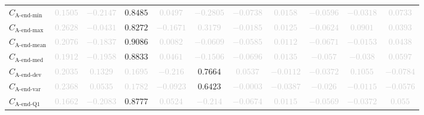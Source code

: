 \documentclass{standalone}
\newcommand{\lastminname}{\text{A-end-min}}
\newcommand{\lastmin}{C_{\lastminname}}
\newcommand{\lastmaxname}{\text{A-end-max}}
\newcommand{\lastmax}{C_{\lastmaxname}}
\newcommand{\lastmeanname}{\text{A-end-mean}}
\newcommand{\lastmean}{C_{\lastmeanname}}
\newcommand{\lastmedianname}{\text{A-end-med}}
\newcommand{\lastmedian}{C_{\lastmedianname}}
\newcommand{\lastdevname}{\text{A-end-dev}}
\newcommand{\lastdev}{C_{\lastdevname}}
\newcommand{\lastvarname}{\text{A-end-var}}
\newcommand{\lastvar}{C_{\lastvarname}}
\newcommand{\lastqonename}{\text{A-end-Q1}}
\newcommand{\lastqone}{C_{\lastqonename}}
\begin{document}
\begin{tabular}{lcccccccccc}
$\lastmin$ & \textcolor{lightgray}{$0.1505$} & \textcolor{lightgray}{$-0.2147$} & $0.8485$ & \textcolor{lightgray}{$0.0497$} & \textcolor{lightgray}{$-0.2805$} & \textcolor{lightgray}{$-0.0738$} & \textcolor{lightgray}{$0.0158$} & \textcolor{lightgray}{$-0.0596$} & \textcolor{lightgray}{$-0.0318$} & \textcolor{lightgray}{$0.0733$} \\ 
$\lastmax$ & \textcolor{lightgray}{$0.2628$} & \textcolor{lightgray}{$-0.0431$} & $0.8272$ & \textcolor{lightgray}{$-0.1671$} & \textcolor{lightgray}{$0.3179$} & \textcolor{lightgray}{$-0.0185$} & \textcolor{lightgray}{$0.0125$} & \textcolor{lightgray}{$-0.0624$} & \textcolor{lightgray}{$0.0901$} & \textcolor{lightgray}{$0.0393$} \\ 
$\lastmean$ & \textcolor{lightgray}{$0.2076$} & \textcolor{lightgray}{$-0.1837$} & $0.9086$ & \textcolor{lightgray}{$0.0082$} & \textcolor{lightgray}{$-0.0609$} & \textcolor{lightgray}{$-0.0585$} & \textcolor{lightgray}{$0.0112$} & \textcolor{lightgray}{$-0.0671$} & \textcolor{lightgray}{$-0.0153$} & \textcolor{lightgray}{$0.0438$} \\ 
$\lastmedian$ & \textcolor{lightgray}{$0.1912$} & \textcolor{lightgray}{$-0.1958$} & $0.8833$ & \textcolor{lightgray}{$0.0461$} & \textcolor{lightgray}{$-0.1506$} & \textcolor{lightgray}{$-0.0696$} & \textcolor{lightgray}{$0.0135$} & \textcolor{lightgray}{$-0.057$} & \textcolor{lightgray}{$-0.038$} & \textcolor{lightgray}{$0.0597$} \\ 
$\lastdev$ & \textcolor{lightgray}{$0.2035$} & \textcolor{lightgray}{$0.1329$} & \textcolor{lightgray}{$0.1695$} & \textcolor{lightgray}{$-0.216$} & $0.7664$ & \textcolor{lightgray}{$0.0537$} & \textcolor{lightgray}{$-0.0112$} & \textcolor{lightgray}{$-0.0372$} & \textcolor{lightgray}{$0.1055$} & \textcolor{lightgray}{$-0.0784$} \\ 
$\lastvar$ & \textcolor{lightgray}{$0.2368$} & \textcolor{lightgray}{$0.0535$} & \textcolor{lightgray}{$0.1782$} & \textcolor{lightgray}{$-0.0923$} & $0.6423$ & \textcolor{lightgray}{$-0.0003$} & \textcolor{lightgray}{$-0.0387$} & \textcolor{lightgray}{$-0.026$} & \textcolor{lightgray}{$-0.0115$} & \textcolor{lightgray}{$-0.0576$} \\ 
$\lastqone$ & \textcolor{lightgray}{$0.1662$} & \textcolor{lightgray}{$-0.2083$} & $0.8777$ & \textcolor{lightgray}{$0.0524$} & \textcolor{lightgray}{$-0.214$} & \textcolor{lightgray}{$-0.0674$} & \textcolor{lightgray}{$0.0115$} & \textcolor{lightgray}{$-0.0569$} & \textcolor{lightgray}{$-0.0372$} & \textcolor{lightgray}{$0.055$} \\ 

\end{tabular}
\end{document}
